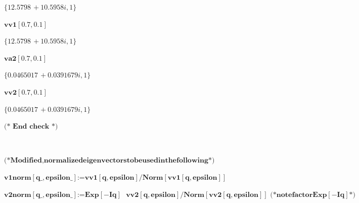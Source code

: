 {\begin{doublespace}
\noindent\(\{12.5798\, +10.5958 i,1\}\)
\end{doublespace}

\begin{doublespace}
\noindent\(\pmb{\text{vv1}[0.7,0.1]}\)
\end{doublespace}

\begin{doublespace}
\noindent\(\{12.5798\, +10.5958 i,1\}\)
\end{doublespace}

\begin{doublespace}
\noindent\(\pmb{\text{va2}[0.7,0.1]}\)
\end{doublespace}

\begin{doublespace}
\noindent\(\{0.0465017\, +0.0391679 i,1\}\)
\end{doublespace}

\begin{doublespace}
\noindent\(\pmb{\text{vv2}[0.7,0.1]}\)
\end{doublespace}

\begin{doublespace}
\noindent\(\{0.0465017\, +0.0391679 i,1\}\)
\end{doublespace}

\begin{doublespace}
\noindent\(\pmb{\text{(* End check *)}}\)
\end{doublespace}

\begin{doublespace}
\noindent\(\pmb{\text{}}\)
\end{doublespace}

\begin{doublespace}
\noindent\(\pmb{\text{(*} \text{Modified}, \text{normalized} \text{eigenvectors} \text{to} \text{be} \text{used} \text{in} \text{the} \text{following}
\text{*)}}\)
\end{doublespace}

\begin{doublespace}
\noindent\(\pmb{\text{v1norm}[\text{q$\_$},\text{epsilon$\_$}]\text{:=}\text{vv1}[q,\text{epsilon}]/\text{Norm}[\text{vv1}[q,\text{epsilon}]]}\)
\end{doublespace}

\begin{doublespace}
\noindent\(\pmb{\text{v2norm}[\text{q$\_$},\text{epsilon$\_$}]\text{:=}\text{Exp}[-I q]\text{  }\text{vv2}[q,\text{epsilon}]/\text{Norm}[\text{vv2}[q,\text{epsilon}]]\text{
   }\text{(*} \text{note} \text{factor} \text{Exp}[-I q] \text{*)}}\)
\end{doublespace}

}
